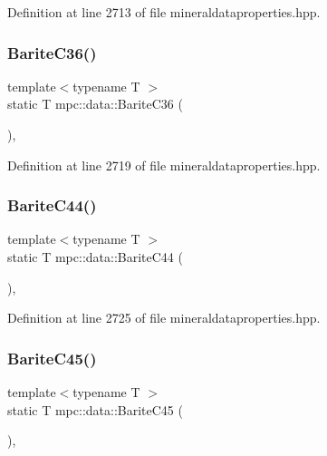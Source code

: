 Definition at line 2713 of file mineraldataproperties.\+hpp.

\mbox{\label{namespacempc_1_1data_a1e9b7dc514593168d0774d48d6f1af59}} 
\subsubsection{\texorpdfstring{Barite\+C36()}{BariteC36()}}
{\footnotesize\ttfamily template$<$typename T $>$ \\
static T mpc\+::data\+::\+Barite\+C36 (\begin{DoxyParamCaption}{ }\end{DoxyParamCaption})\hspace{0.3cm}{\ttfamily [inline]}, {\ttfamily [static]}}



Definition at line 2719 of file mineraldataproperties.\+hpp.

\mbox{\label{namespacempc_1_1data_a9296325a0efd728ab1b80650380f0fd8}} 
\subsubsection{\texorpdfstring{Barite\+C44()}{BariteC44()}}
{\footnotesize\ttfamily template$<$typename T $>$ \\
static T mpc\+::data\+::\+Barite\+C44 (\begin{DoxyParamCaption}{ }\end{DoxyParamCaption})\hspace{0.3cm}{\ttfamily [inline]}, {\ttfamily [static]}}



Definition at line 2725 of file mineraldataproperties.\+hpp.

\mbox{\label{namespacempc_1_1data_a3db0416d5b464e439dde18d2f120b1d1}} 
\subsubsection{\texorpdfstring{Barite\+C45()}{BariteC45()}}
{\footnotesize\ttfamily template$<$typename T $>$ \\
static T mpc\+::data\+::\+Barite\+C45 (\begin{DoxyParamCaption}{ }\end{DoxyParamCaption})\hspace{0.3cm}{\ttfamily [inline]}, {\ttfamily [static]}}



